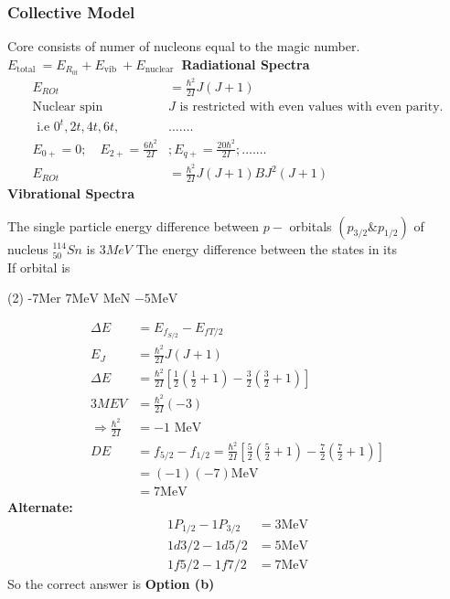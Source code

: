 \subsubsection{Collective Model}
Core consists of numer of nucleons equal to the magic number.\\
$E_{\text {total }}=E_{R_{0 t}}+E_{\text {vib }}+E_{\text {nuclear }}$
\textbf{Radiational Spectra}
\begin{align*}
E_{R O t}&=\frac{\hbar^{2}}{2 I} J(J+1)\\
\text{Nuclear spin }&\text{$J$ is restricted with even values with even parity.}\\
\text { i.e } 0^{t}, 2 t, 4 t, 6 t,& \ldots . \ldots\\
E_{0+}=0 ; \quad E_{2+}=\frac{6 \hbar^{2}}{2 I} &; E_{q+}=\frac{20 \hbar^{2}}{2 I} ; \ldots . \ldots\\
E_{R O t}&=\frac{\hbar^{2}}{2 I} J(J+1)B J^{2}(J+1)
\end{align*}
\textbf{Vibrational Spectra}\\
\begin{exercise}
	The single particle energy difference between $p-$ orbitals $\left(p_{3 / 2} \& p_{1 / 2}\right)$ of nucleus ${}^{114}_{50}Sn$ is $3MeV$ The energy difference between the states in its \\
	If orbital is 
	 \begin{tasks}(2)
		\task[\textbf{a.}]-7Mer
		\task[\textbf{b.}]$7 \mathrm{MeV}$
		 MeN
		\task[\textbf{d.}] $-5 \mathrm{MeV}$
	\end{tasks}
\end{exercise}
\begin{answer}
	\begin{align*}
	\Delta E&=E_{f_{S / 2}}-E_{f T / 2}\\
	E_{J}&=\frac{\hbar^{2}}{2 I} J(J+1)\\
	\Delta E&=\frac{\hbar^{2}}{2 I}\left[\frac{1}{2}\left(\frac{1}{2}+1\right)-\frac{3}{2}\left(\frac{3}{2}+1\right)\right]\\
	3 M E V&=\frac{\hbar^{2}}{2 I}(-3)\\
	\Rightarrow \frac{\hbar^{2}}{2 I}&=-1 \text { MeV }\\
	D E&=f_{5 / 2}-f_{1 / 2}=\frac{\hbar^{2}}{2 I}\left[\frac{5}{2}\left(\frac{5}{2}+1\right)-\frac{7}{2}\left(\frac{7}{2}+1\right)\right]\\
	&=(-1)(-7) \mathrm{MeV}\\
	&=7 \mathrm{MeV}
	\end{align*}
\textbf{	Alternate:}
	\begin{align*}
	1 P_{1 / 2}-1 P_{3 / 2}&=3 \mathrm{MeV}\\
	1d{ 3 / 2}-1 d{5/2}&=5 \mathrm{MeV}\\
	1f{ 5 / 2}-1 f{7/2}&=7 \mathrm{MeV}
	\end{align*}
	So the correct answer is \textbf{Option (b)}
\end{answer}
